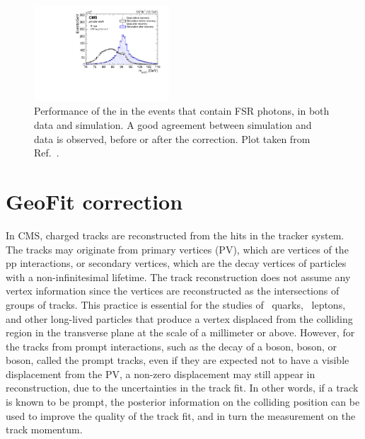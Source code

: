 \begin{figure}[!htb]
      \centering
      \captionsetup{justification=justified}
      \includegraphics[width=0.45\textwidth]{pics/muon_corr/FSR/FSRrecovery_Validation.pdf}
      \caption{Performance of the \FSR in the \zmm events that contain FSR photons, in both data and simulation. 
               A good agreement between simulation and data is observed, before or after the correction.
               Plot taken from Ref.~\cite{oliverthesis}.}
      \label{fig:fsr_val}
\end{figure}


\section{GeoFit correction} \label{sec:GeoFit}

In CMS, charged tracks are reconstructed from the hits in the tracker system.
The tracks may originate from primary vertices (PV), which are vertices of the pp interactions,
or secondary vertices, which are the decay vertices of particles with a non-infinitesimal lifetime.
The track reconstruction does not assume any vertex information since the vertices are reconstructed as the intersections of groups of tracks.
This practice is essential for the studies of \Pqb ~quarks, \tau ~leptons, 
and other long-lived particles that produce a vertex displaced from the colliding region in the transverse plane at the scale of a millimeter or above.
However, for the tracks from prompt interactions, such as the decay of a \PZ boson, \PW boson, or \PH boson,
called the prompt tracks, even if they are expected not to have a visible displacement from the PV, 
a non-zero displacement may still appear in reconstruction, due to the uncertainties in the track fit.
In other words, if a track is known to be prompt, the posterior information on the colliding position 
can be used to improve the quality of the track fit, and in turn the measurement on the track momentum.

